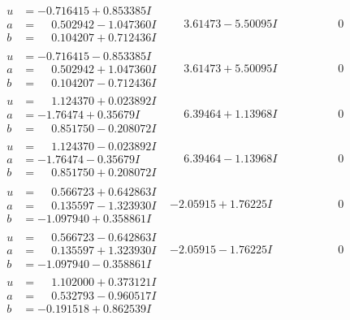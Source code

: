 \documentclass[1p]{elsarticle_modified}
\theoremstyle{definition}
\begin{document}
$$\begin{array}{c|c|c}
\begin{aligned}
u &= -0.716415 + 0.853385 I \\
a &= \phantom{-}0.502942 - 1.047360 I \\
b &= \phantom{-}0.104207 + 0.712436 I\end{aligned}
 & \phantom{-}3.61473 - 5.50095 I & \phantom{-0.000000 } 0 \\ \hline\begin{aligned}
u &= -0.716415 - 0.853385 I \\
a &= \phantom{-}0.502942 + 1.047360 I \\
b &= \phantom{-}0.104207 - 0.712436 I\end{aligned}
 & \phantom{-}3.61473 + 5.50095 I & \phantom{-0.000000 } 0 \\ \hline\begin{aligned}
u &= \phantom{-}1.124370 + 0.023892 I \\
a &= -1.76474 + 0.35679 I \\
b &= \phantom{-}0.851750 - 0.208072 I\end{aligned}
 & \phantom{-}6.39464 + 1.13968 I & \phantom{-0.000000 } 0 \\ \hline\begin{aligned}
u &= \phantom{-}1.124370 - 0.023892 I \\
a &= -1.76474 - 0.35679 I \\
b &= \phantom{-}0.851750 + 0.208072 I\end{aligned}
 & \phantom{-}6.39464 - 1.13968 I & \phantom{-0.000000 } 0 \\ \hline\begin{aligned}
u &= \phantom{-}0.566723 + 0.642863 I \\
a &= \phantom{-}0.135597 - 1.323930 I \\
b &= -1.097940 + 0.358861 I\end{aligned}
 & -2.05915 + 1.76225 I & \phantom{-0.000000 } 0 \\ \hline\begin{aligned}
u &= \phantom{-}0.566723 - 0.642863 I \\
a &= \phantom{-}0.135597 + 1.323930 I \\
b &= -1.097940 - 0.358861 I\end{aligned}
 & -2.05915 - 1.76225 I & \phantom{-0.000000 } 0 \\ \hline\begin{aligned}
u &= \phantom{-}1.102000 + 0.373121 I \\
a &= \phantom{-}0.532793 - 0.960517 I \\
b &= -0.191518 + 0.862539 I\end{aligned}

\end{array}$$
\end{document}
